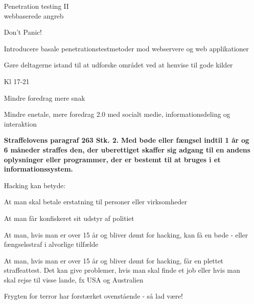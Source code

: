 \documentclass[20pt,landscape,a4paper,footrule]{foils}
\begin{document}


\mytitlepage
{Penetration testing II\\ webbaserede angreb}


\LogoOn




\centerline{\color{titlecolor}\LARGE Don't Panic!}


\begin{list1}
\item Introducere basale penetrationstestmetoder mod webservere og web
  applikationer
\item Gøre deltagerne istand til at udforske området ved at henvise
  til gode kilder
\end{list1}



\begin{list1}
\item Kl 17-21
\item Mindre foredrag mere snak
\item Mindre enetale, mere foredrag 2.0 med socialt medie, informationsdeling og interaktion
\end{list1}




{\bfseries Straffelovens paragraf 263 Stk. 2. Med bøde eller fængsel indtil 1 år og 6 måneder straffes den, der uberettiget skaffer sig adgang til en andens oplysninger eller programmer, der er bestemt til at bruges i et informationssystem. }

Hacking kan betyde:
\begin{list2}
\item At man skal betale erstatning til personer eller virksomheder
\item At man får konfiskeret sit udstyr af politiet
\item At man, hvis man er over 15 år og bliver dømt for hacking, kan
  få en bøde - eller fængselsstraf i alvorlige tilfælde
\item At man, hvis man er over 15 år og bliver dømt for hacking, får
en plettet straffeattest. Det kan give problemer, hvis man skal finde
et job eller hvis man skal rejse til visse lande, fx USA og
Australien
\item Frygten for terror har forstærket ovenstående - så lad være!
\end{list2}
\end{document}
